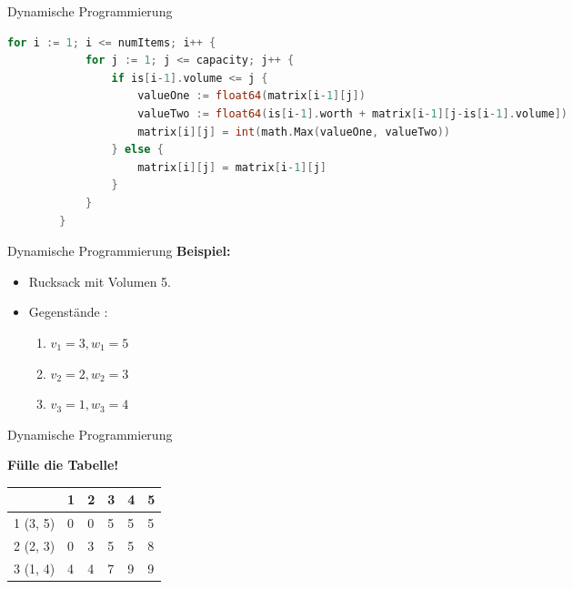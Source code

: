 \documentclass[10pt]{beamer}
\begin{document}
\begin{frame}[fragile]{Dynamische Programmierung}
		\begin{lstlisting}[language=go]
		for i := 1; i <= numItems; i++ {
			for j := 1; j <= capacity; j++ {
				if is[i-1].volume <= j {
					valueOne := float64(matrix[i-1][j])
					valueTwo := float64(is[i-1].worth + matrix[i-1][j-is[i-1].volume])
					matrix[i][j] = int(math.Max(valueOne, valueTwo))
				} else {
					matrix[i][j] = matrix[i-1][j]
				}
			}
		}			
		\end{lstlisting}
\end{frame}
	
\begin{frame}[fragile]{Dynamische Programmierung}
	\textbf{Beispiel:}
	\begin{itemize}
		\item[] Rucksack mit Volumen 5.
		\item[] Gegenstände :
		\begin{enumerate}
			\item $v_{1} = 3, w_{1} = 5$
			\item $v_{2} = 2, w_{2} = 3$
			\item $v_{3} = 1, w_{3} = 4$
		\end{enumerate} 
	\end{itemize}
\end{frame}
		
\begin{frame}[fragile]{Dynamische Programmierung}
	\begin{center}
		\textbf{Fülle die Tabelle!}
	\end{center}
	\begin{center}
		\begin{tabular}{|l||p{0.5cm}|p{0.5cm}|p{0.5cm}|p{0.5cm}|p{0.5cm}|}
		\hline
		\diagbox{I:}{V:}
		& 1 & 2 & 3 & 4 & 5 \\
		\hline
		1 (3, 5)	&    0    &     0     &      5      &       5      &       5     \\
		\hline
		2 (2, 3)	&    0    &     3     &      5      &       5      &       8     \\
		\hline
		3 (1, 4)	&    4    &     4     &      7      &       9      &       9     \\
		\hline
	\end{tabular}

	\end{center}

\end{frame}
\end{document}
